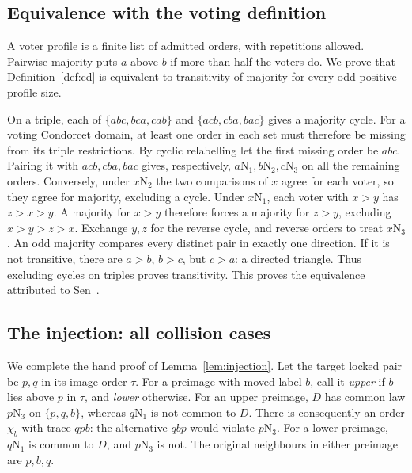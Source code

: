 \documentclass[11pt,letterpaper]{article}
\theoremstyle{definition}
\newcommand{\N}[2]{#1\mathrm N_{#2}}
\begin{document}
\subsection{Equivalence with the voting definition}\label{app:voting}
A voter profile is a finite list of admitted orders, with repetitions
allowed. Pairwise majority puts \(a\) above \(b\) if more than half
the voters do. We prove that Definition~\ref{def:cd} is equivalent to
transitivity of majority for every odd positive profile size.

On a triple, each of \(\{abc,bca,cab\}\) and
\(\{acb,cba,bac\}\) gives a majority cycle. For a voting Condorcet
domain, at least one order in each set must therefore be missing from
its triple restrictions. By cyclic relabelling let the first missing
order be \(abc\). Pairing it with \(acb,cba,bac\) gives, respectively,
\(\N a1,\N b2,\N c3\) on all the remaining orders.
Conversely, under \(\N x2\) the two comparisons of \(x\) agree for
each voter, so they agree for majority, excluding a cycle.
Under \(\N x1\), each voter with \(x>y\) has \(z>x>y\).
A majority for \(x>y\) therefore forces a majority for \(z>y\),
excluding \(x>y>z>x\). Exchange \(y,z\) for the reverse cycle,
and reverse orders to treat \(\N x3\). An odd majority compares
every distinct pair in exactly one direction. If it is not transitive,
there are \(a>b\), \(b>c\), but \(c>a\): a directed triangle.
Thus excluding cycles on triples proves transitivity. This proves the
equivalence attributed to Sen~\cite{Sen}.

\subsection{The injection: all collision cases}\label{app:collisions}
We complete the hand proof of Lemma~\ref{lem:injection}.
Let the target locked pair be \(p,q\) in its image order \(\tau\).
For a preimage with moved label \(b\), call it \emph{upper} if \(b\)
lies above \(p\) in \(\tau\), and \emph{lower} otherwise.
For an upper preimage, \(D\) has common law \(\N p3\) on
\(\{p,q,b\}\), whereas \(\N q1\) is not common to \(D\). There is consequently an order \(\chi_b\) with
trace \(qpb\): the alternative \(qbp\) would violate \(\N p3\).
For a lower preimage, \(\N q1\) is common to \(D\), and \(\N p3\) is not.
The original neighbours in either preimage are \(p,b,q\).
\end{document}
